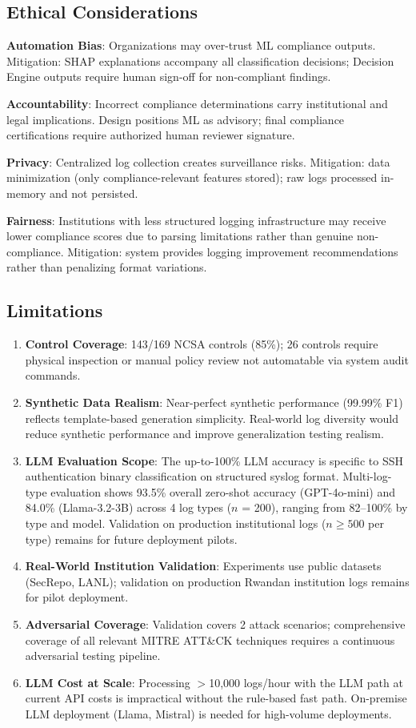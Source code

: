 \documentclass[futureinternet,article,submit,pdftex,moreauthors]{Definitions/mdpi}
\begin{document}
\subsection{Ethical Considerations}

\textbf{Automation Bias}: Organizations may over-trust ML compliance outputs. Mitigation:
SHAP explanations accompany all classification decisions; Decision Engine outputs require
human sign-off for non-compliant findings.

\textbf{Accountability}: Incorrect compliance determinations carry institutional and legal
implications. Design positions ML as advisory; final compliance certifications require
authorized human reviewer signature.

\textbf{Privacy}: Centralized log collection creates surveillance risks. Mitigation:
data minimization (only compliance-relevant features stored); raw logs processed in-memory
and not persisted.

\textbf{Fairness}: Institutions with less structured logging infrastructure may receive lower
compliance scores due to parsing limitations rather than genuine non-compliance. Mitigation:
system provides logging improvement recommendations rather than penalizing format variations.

\subsection{Limitations}

\begin{enumerate}
\item \textbf{Control Coverage}: 143/169 NCSA controls (85\%); 26 controls require physical
inspection or manual policy review not automatable via system audit commands.
\item \textbf{Synthetic Data Realism}: Near-perfect synthetic performance (99.99\% F1)
reflects template-based generation simplicity. Real-world log diversity would reduce synthetic
performance and improve generalization testing realism.
\item \textbf{LLM Evaluation Scope}: The up-to-100\% LLM accuracy is specific to SSH
authentication binary classification on structured syslog format. Multi-log-type evaluation
shows 93.5\% overall zero-shot accuracy (GPT-4o-mini) and 84.0\% (Llama-3.2-3B) across
4 log types ($n$ = 200), ranging from 82--100\% by type and model. Validation on
production institutional logs ($n \geq 500$ per type) remains for future deployment pilots.
\item \textbf{Real-World Institution Validation}: Experiments use public datasets
(SecRepo, LANL); validation on production Rwandan institution logs remains for pilot
deployment.
\item \textbf{Adversarial Coverage}: Validation covers 2 attack scenarios; comprehensive
coverage of all relevant MITRE ATT\&CK techniques requires a continuous adversarial testing
pipeline.
\item \textbf{LLM Cost at Scale}: Processing ${>}$10{,}000 logs/hour with the LLM path at
current API costs is impractical without the rule-based fast path. On-premise LLM deployment
(Llama, Mistral) is needed for high-volume deployments.
\end{enumerate}
\end{document}
